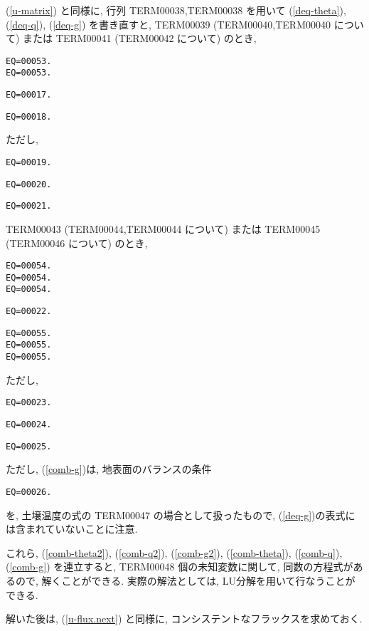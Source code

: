 (\ref{u-matrix}) と同様に, 行列 TERM00038,TERM00038 を用いて
(\ref{deq-theta}), (\ref{deq-q}), (\ref{deq-g}) を書き直すと, 
%
 TERM00039 (TERM00040,TERM00040 について) または TERM00041 (TERM00042 について) のとき, 
%
  \begin{verbatim}
EQ=00053.
EQ=00053.
\end{verbatim}

\begin{verbatim}
EQ=00017.
\end{verbatim}

\begin{verbatim}
EQ=00018.
\end{verbatim}
%
ただし, 
\begin{verbatim}
EQ=00019.
\end{verbatim}
\begin{verbatim}
EQ=00020.
\end{verbatim}
\begin{verbatim}
EQ=00021.
\end{verbatim}

 TERM00043 (TERM00044,TERM00044 について) または TERM00045 (TERM00046 について) のとき, 
%
  \begin{verbatim}
EQ=00054.
EQ=00054.
EQ=00054.
\end{verbatim}
%
\begin{verbatim}
EQ=00022.
\end{verbatim}
%
\begin{verbatim}
EQ=00055.
EQ=00055.
EQ=00055.
\end{verbatim}
%
ただし, 
\begin{verbatim}
EQ=00023.
\end{verbatim}
\begin{verbatim}
EQ=00024.
\end{verbatim}
\begin{verbatim}
EQ=00025.
\end{verbatim}
%
ただし, (\ref{comb-g})は, 地表面のバランスの条件
\begin{verbatim}
EQ=00026.
\end{verbatim}
を, 土壌温度の式の TERM00047 の場合として扱ったもので, 
(\ref{deq-g})の表式には含まれていないことに注意. 

これら,
(\ref{comb-theta2}), (\ref{comb-q2}), (\ref{comb-g2}), 
(\ref{comb-theta}), (\ref{comb-q}), (\ref{comb-g})
を連立すると, TERM00048 個の未知変数に関して, 
同数の方程式があるので, 解くことができる.
実際の解法としては, LU分解を用いて行なうことができる.

解いた後は, 
(\ref{u-flux.next}) と同様に,
コンシステントなフラックスを求めておく.

